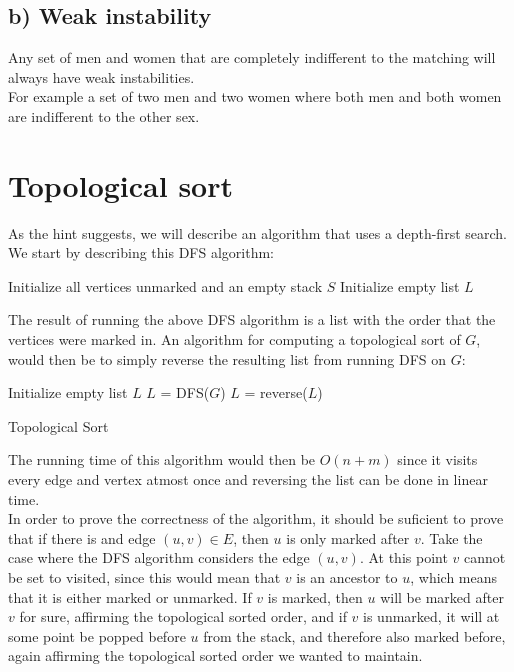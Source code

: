 \documentclass[a4paper]{article}
\begin{document}
\subsection*{b) Weak instability}
Any set of men and women that are completely indifferent to the matching will always have weak instabilities.\\
For example a set of two men and two women where both men and both women are indifferent to the other sex.

\section{Topological sort}
As the hint suggests, we will describe an algorithm that uses a depth-first search. We start by describing this DFS algorithm:\\

\begin{algorithm}[H]
  Initialize all vertices unmarked and an empty stack $S$\;
  Initialize empty list $L$\;
\end{algorithm}
The result of running the above DFS algorithm is a list with the order that the vertices were marked in. An algorithm for computing a topological sort of $G$, would then be to simply reverse the resulting list from running DFS on $G$:\\

\begin{algorithm}[H]
  Initialize empty list $L$\;
  $L$ = DFS($G$)\;
  $L$ = reverse($L$)
  \caption{Topological Sort}
\end{algorithm}

The running time of this algorithm would then be $O(n+m)$ since it visits every edge and vertex atmost once and reversing the list can be done in linear time.\\

In order to prove the correctness of the algorithm, it should be suficient to prove that if there is and edge $(u,v)\in E$, then $u$ is only marked after $v$. Take the case where the DFS algorithm considers the edge $(u,v)$. At this point $v$ cannot be set to visited, since this would mean that $v$ is an ancestor to $u$, which means that it is either marked or unmarked. If $v$ is marked, then $u$ will be marked after $v$ for sure, affirming the topological sorted order, and if $v$ is unmarked,
it will at some point be popped before $u$ from the stack, and therefore also marked before, again affirming the topological sorted order we wanted to maintain.
\end{document}
